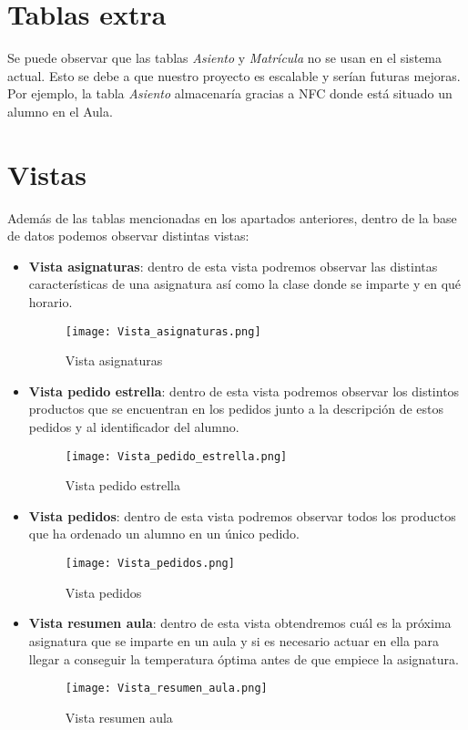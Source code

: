 \documentclass[12pt]{report}
\begin{document}
\section{Tablas extra}
Se puede observar que las tablas \textit{Asiento} y \textit{Matrícula} no se usan en el sistema actual. Esto se debe a que nuestro proyecto es escalable y serían futuras mejoras. Por ejemplo, la tabla \textit{Asiento} almacenaría gracias a NFC donde está situado un alumno en el Aula.
\newpage
\section{Vistas}
Además de las tablas mencionadas en los apartados anteriores, dentro de la base de datos podemos observar distintas vistas:
\begin{itemize}
    \item \textbf{Vista asignaturas}: dentro de esta vista podremos observar las distintas características de una asignatura así como la clase donde se imparte y en qué horario.
    \begin{figure}[H]
        \centering
        \texttt{[image: Vista\_asignaturas.png]}
        \caption{Vista asignaturas}
        \label{fig:Figura}
    \end{figure}
    
    \item \textbf{Vista pedido estrella}: dentro de esta vista podremos observar los distintos productos que se encuentran en los pedidos junto a la descripción de estos pedidos y al identificador del alumno.
    \begin{figure}[H]
        \centering
        \texttt{[image: Vista\_pedido\_estrella.png]}
        \caption{Vista pedido estrella}
        \label{fig:Figura}
    \end{figure}
    \newpage
    \item \textbf{Vista pedidos}: dentro de esta vista podremos observar todos los productos que ha ordenado un alumno en un único pedido.
    \begin{figure}[H]
        \centering
        \texttt{[image: Vista\_pedidos.png]}
        \caption{Vista pedidos}
        \label{fig:Figura}
    \end{figure}
    
    \item \textbf{Vista resumen aula}: dentro de esta vista obtendremos cuál es la próxima asignatura que se imparte en un aula y si es necesario actuar en ella para llegar a conseguir la temperatura óptima antes de que empiece la asignatura.
    \begin{figure}[H]
        \centering
        \texttt{[image: Vista\_resumen\_aula.png]}
        \caption{Vista resumen aula}
        \label{fig:Figura}
    \end{figure}
\end{itemize}
\end{document}
